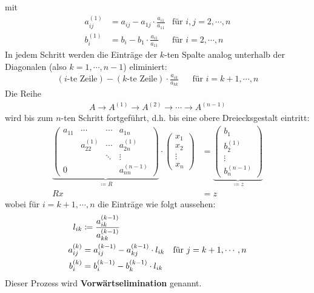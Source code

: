 \documentclass[ngerman,fontsize=11pt, paper=a4, parskip=false, titlepage=false, toc=bib]{scrbook}
\begin{document}
mit
\begin{align*}
	a_{ij}^{(1)} &= a_{ij}-a_{1j}\cdot \frac{a_{i1}}{a_{11}} & \text{für }i,j = 2, \cdots, n \\
	b_i^{(1)}      &= b_i- b_1\cdot \frac{a_{i1}}{a_{11}}        & \text{für }i = 2, \cdots, n 
\end{align*}
In jedem Schritt werden die Einträge der $k$-ten Spalte analog unterhalb der Diagonalen (also $k=1, \cdots, n-1$) eliminiert:
\begin{align*}
	(\text{$i$-te Zeile})- (\text{$k$-te Zeile})\cdot\frac{a_{ik}}{a_{kk}} && \text{für } i=k+1, \cdots ,n 
\end{align*}
Die Reihe 
\begin{gather*}
			A \rightarrow A^{(1)} \rightarrow A^{(2)} \rightarrow \dotsm \rightarrow A^{(n-1)}
\end{gather*}
wird bis zum $n$-ten Schritt fortgeführt, d.h. bis eine obere Dreiecksgestalt eintritt:
\begin{align}
\nonumber
\underbrace{	\begin{pmatrix}
	a_{11} & \dotsm & \dotsm & a_{1n} \\
	             & a_{22}^{(1)} & \dotsm & a_{2n}^{(1)} \\
	             &&              \ddots  &  \vdots \\
	   0        && &                             a_{nn}^{(n-1)}
	\end{pmatrix}}_{\coloneqq R}
	\cdot
	\begin{pmatrix}
		x_1 \\
		x_2 \\
		\vdots \\
		x_n
	\end{pmatrix}
	& =
	\underbrace{\begin{pmatrix}
		b_1 \\
		b_2^{(1)} \\
		\vdots \\
		b_n^{(n-1)}
	\end{pmatrix}}_{\coloneqq z} \\
Rx &= z 	\label{II.1.1} 
\end{align}
wobei für  $i=k+1, \cdots ,n$ die Einträge wie folgt aussehen:
\begin{align}	
	l_{ik} &\coloneqq \frac{a_{ik}^{(k-1)}}{a_{kk}^{(k-1)}} \label{II.1.2} \\
	a_{ij}^{(k)} &= a_{ij}^{(k-1)} - a_{kj}^{(k-1)}\cdot l_{ik} \label{II.1.3}
				 & \text{für } j=k+1, \cdots , n\\ %
	b_i^{(k)} &= b_i^{(k-1)} -b_k^{(k-1)} \cdot   l_{ik}\label{II.1.4}\index{Vorwärtssubstitution}
\end{align}
Dieser Prozess wird \textbf{Vorwärtselimination} genannt.
\end{document}
